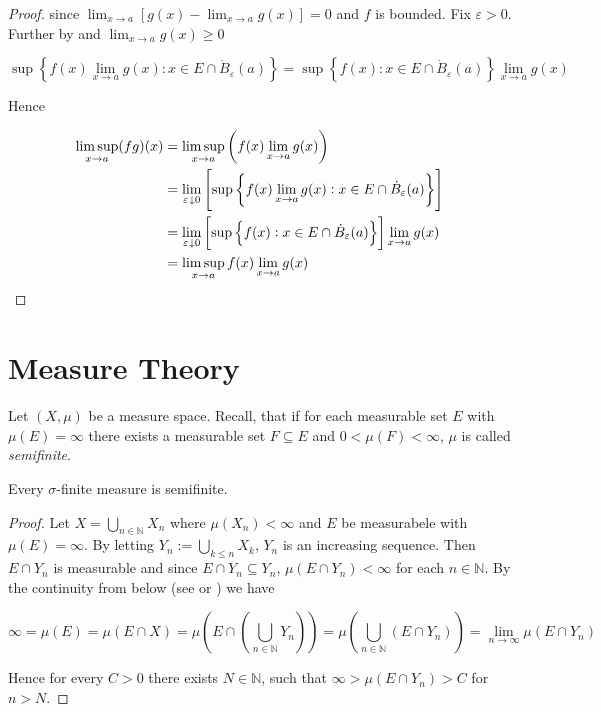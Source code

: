 \begin{appendix}
\begin{proof}
		since $\lim_{x \to a}\left[ g(x) - \lim_{x \to a} g(x)\right] = 0$ and $f$ is bounded. Fix $\varepsilon > 0$. Further by \cite[357]{bourbaki:general_topology:1995} and $\lim_{x \to a}g(x) \geqslant 0$ 

		\begin{equation*}
			\sup\left\{ f(x)\lim_{x \to a}g(x) : x \in E \cap \dot{B}_\varepsilon(a)\right\} = \sup\left\{ f(x) : x \in E \cap \dot{B}_\varepsilon(a)\right\}\lim_{x \to a}g(x)
		\end{equation*}

		Hence

		\begin{gather}
			\begin{aligned}
				\limsup_{x \to a} (fg)(x) &= \limsup_{x \to a}\left( f(x) \lim_{x \to a}g(x) \right)\\
				&= \lim_{\varepsilon \todown 0} \left[ \sup\left\{ f(x)\lim_{x \to a}g(x) : x \in E \cap \dot{B}_\varepsilon(a)\right\}\right]\\
				&= \lim_{\varepsilon \todown 0} \left[ \sup\left\{ f(x) : x \in E \cap \dot{B}_\varepsilon(a)\right\}\right]\lim_{x \to a}g(x)\\
				&= \limsup_{x \to a}f(x) \lim_{x \to a} g(x)
			\end{aligned}
		\end{gather}
	\end{proof}

	\section{Measure Theory}
	Let $(X,\mu)$ be a measure space. Recall, that if for each measurable set $E$ with $\mu(E) = \infty$ there exists a measurable set $F \subseteq E$ and $0 < \mu(F) < \infty$, $\mu$ is called \emph{semifinite}.

		\begin{lemma}
			Every $\sigma$-finite measure is semifinite.
		\end{lemma}

		\begin{proof}
			Let $X = \bigcup_{n \in \mathbb{N}} X_n$ where $\mu(X_n) < \infty$ and $E$ be measurabele with $\mu(E) = \infty$. By letting $Y_n := \bigcup_{k \leqslant n} X_k$, $Y_n$ is an increasing sequence. Then $E \cap Y_n$ is measurable and since $E \cap Y_n \subseteq Y_n$, $\mu(E \cap Y_n) < \infty$ for each $n \in \mathbb{N}$. By the continuity from below (see \cite[10]{cohn:measure_theory:2013} or \cite[26]{folland:real_analysis:1999}) we have

			\begin{equation*}
				\infty = \mu(E) = \mu(E \cap X) = \mu\left(E \cap \left(\bigcup_{n \in \mathbb{N}} Y_n\right)\right) = \mu\left(\bigcup_{n \in \mathbb{N}} \left( E \cap Y_n \right)\right) = \lim\limits_{n \rightarrow \infty} \mu\left( E \cap Y_n \right)
			\end{equation*}

			Hence for every $C > 0$ there exists $N \in \mathbb{N}$, such that $\infty > \mu(E \cap Y_n) > C$ for $n > N$.
		\end{proof}

\end{appendix}

\printbibliography

